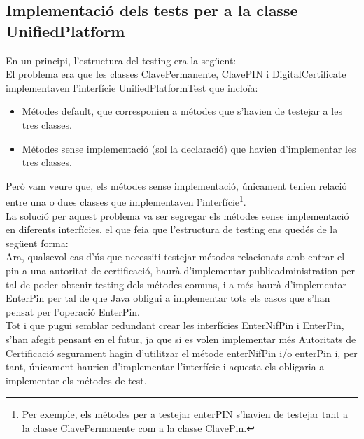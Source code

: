 \documentclass[12pt, letterpaper]{article}
\begin{document}
\newpage
\subsection{Implementació dels tests per a la classe UnifiedPlatform}
\label{interfaces}
En un principi, l'estructura del testing era la següent:\\
\vspace{0.5cm}
El problema era que les classes ClavePermanente, ClavePIN i DigitalCertificate implementaven l'interfície UnifiedPlatformTest que incloïa:
\begin{itemize}
  \item Métodes default, que corresponien a métodes que s'havien de testejar a les tres classes.
  \item Métodes sense implementació (sol la declaració) que havien d'implementar les tres classes.
\end{itemize}

Però vam veure que, els métodes sense implementació, únicament tenien relació entre una o dues classes que implementaven l'interfície\footnote{Per exemple, els métodes per a testejar enterPIN s'havien de testejar tant a la classe ClavePermanente com a la classe ClavePin.}. \\
La solució per aquest problema va ser segregar els métodes sense implementació en diferents interfícies, el que feia que l'estructura de testing ens quedés de la següent forma:\\

\vspace{0.5cm}
Ara, qualsevol cas d'ús que necessiti testejar métodes relacionats amb entrar el pin a una autoritat de certificació, haurà d'implementar publicadministration per tal de poder obtenir testing dels métodes comuns, i a més haurà d'implementar EnterPin per tal de que Java obligui a implementar tots els casos que s'han pensat per l'operació EnterPin.\\

Tot i que pugui semblar redundant crear les interfícies EnterNifPin i EnterPin, s'han afegit pensant en el futur, ja que si es volen implementar més Autoritats de Certificació segurament hagin d'utilitzar el métode enterNifPin i/o enterPin i, per tant, únicament haurien d'implementar l'interfície i aquesta els obligaria a implementar els métodes de test.
\end{document}
